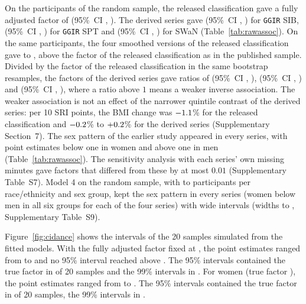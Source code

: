 \documentclass[12pt]{article}
\newcommand{\CI}[2]{(95\%\ CI #1, #2)}
\begin{document}
On the \rawModelN{} participants of the random sample, the released
classification gave a fully adjusted factor of \rawPaxpredmMBEst{}
\CI{\rawPaxpredmMBLo}{\rawPaxpredmMBHi}. The derived series gave \rawGgirSibMBEst{} \CI{\rawGgirSibMBLo}{\rawGgirSibMBHi} for \texttt{GGIR} SIB, \rawGgirSptMBEst{} \CI{\rawGgirSptMBLo}{\rawGgirSptMBHi} for
\texttt{GGIR} SPT and \rawSwanMBEst{} \CI{\rawSwanMBLo}{\rawSwanMBHi} for SWaN (Table~\ref{tab:rawassoc}). On the same participants, the four smoothed versions of the released classification gave \rawSmoothedMBMin{} to \rawSmoothedMBMax{}, above the factor of the released classification as in the published sample. Divided by the factor of the released classification in the same bootstrap resamples, the factors of the derived series gave ratios of \rawGgirSibMBRatioEst{} \CI{\rawGgirSibMBRatioLo}{\rawGgirSibMBRatioHi}, \rawGgirSptMBRatioEst{} \CI{\rawGgirSptMBRatioLo}{\rawGgirSptMBRatioHi} and \rawSwanMBRatioEst{} \CI{\rawSwanMBRatioLo}{\rawSwanMBRatioHi}, where a ratio above $1$ means a weaker inverse association. The weaker association is not an effect of the narrower quintile contrast of the derived series: per 10 SRI points, the BMI change was $-1.1$\% for the released classification and $-0.2$\% to $+0.2$\% for the derived series (Supplementary Section~7). The sex
pattern of the earlier study appeared in every series, with point estimates
below one in women and above one in men (Table~\ref{tab:rawassoc}). The sensitivity analysis with each series' own
missing minutes gave factors that differed from these by at most $0.01$
(Supplementary Table~S7).
Model 4 on the random sample, with \mfourRawNmin{} to \mfourRawNmax{}
participants per race/ethnicity and sex group, kept the sex pattern in every
series (women below men in all six groups for each of the four series) with wide intervals (widths \mfourRawWidthMin{} to \mfourRawWidthMax{}, Supplementary Table~S9).

Figure~\ref{fig:cidance} shows the intervals of the 20 samples simulated from
the fitted models. With the fully adjusted factor fixed at \simTwoTruth{}, the
point estimates ranged from \simTwoMfMin{} to \simTwoMfMax{} and no 95\% interval reached above \simTwoHiMax{}. The 95\% intervals contained the true factor in \simTwoCoverNinetyFive{} of 20 samples and the
99\% intervals in \simTwoCoverNinetyNine{}. For women (true factor
\simThreeWTruth), the point estimates ranged from \simThreeWMfMin{} to \simThreeWMfMax{}. The 95\% intervals contained the true factor in \simThreeWCoverNinetyFive{} of 20 samples, the 99\% intervals in
\simThreeWCoverNinetyNine{}.
\end{document}

